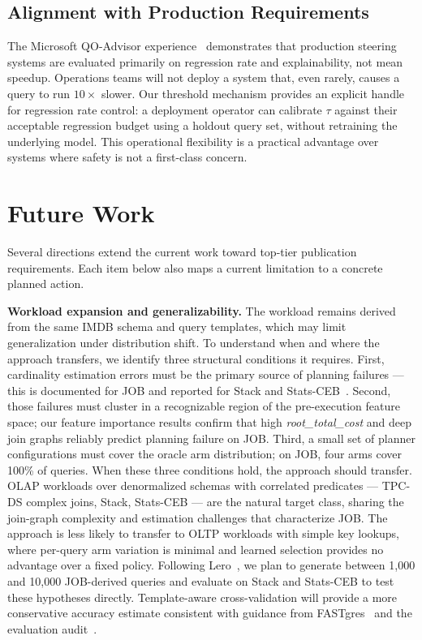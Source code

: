 \documentclass[sigconf,natbib=false]{article}
\newcommand{\feat}[1]{\textit{#1}}
\newcommand{\threshold}{\tau}
\begin{document}
\subsection{Alignment with Production Requirements}

The Microsoft QO-Advisor experience~\cite{Ding2022} demonstrates that production steering
systems are evaluated primarily on regression rate and explainability, not mean speedup.
Operations teams will not deploy a system that, even rarely, causes a query to run $10\times$
slower. Our threshold mechanism provides an explicit handle for regression rate control: a
deployment operator can calibrate $\threshold$ against their acceptable regression budget using
a holdout query set, without retraining the underlying model. This operational flexibility is
a practical advantage over systems where safety is not a first-class concern.

\section{Future Work}
\label{sec:future}

Several directions extend the current work toward top-tier publication requirements.
Each item below also maps a current limitation to a concrete planned action.

\textbf{Workload expansion and generalizability.}
The workload remains derived from the same IMDB schema and query templates, which may limit
generalization under distribution shift. To understand when and where the approach transfers,
we identify three structural conditions it requires. First, cardinality estimation errors
must be the primary source of planning failures — this is documented for JOB and reported
for Stack and Stats-CEB~\cite{Habich2023,Zhu2023Lero}. Second, those failures must cluster
in a recognizable region of the pre-execution feature space; our feature importance results
confirm that high \feat{root\_total\_cost} and deep join graphs reliably predict planning
failure on JOB. Third, a small set of planner configurations must cover the oracle arm
distribution; on JOB, four arms cover 100\% of queries. When these three conditions hold,
the approach should transfer. OLAP workloads over denormalized schemas with correlated
predicates — TPC-DS complex joins, Stack, Stats-CEB — are the natural target class, sharing
the join-graph complexity and estimation challenges that characterize JOB. The approach is
less likely to transfer to OLTP workloads with simple key lookups, where per-query arm
variation is minimal and learned selection provides no advantage over a fixed policy.
Following Lero~\cite{Zhu2023Lero}, we plan to generate between 1{,}000 and 10{,}000
JOB-derived queries and evaluate on Stack and Stats-CEB to test these hypotheses directly.
Template-aware cross-validation will provide a more conservative accuracy estimate consistent
with guidance from FASTgres~\cite{Habich2023} and the evaluation audit~\cite{Lehmann2024}.
\end{document}
